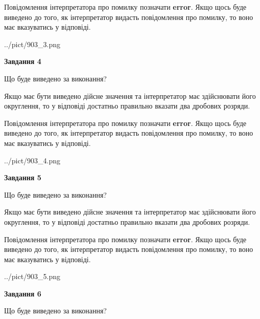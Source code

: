 \documentclass[12pt, ukrainian]{article}
\begin{document}
{\begin {Large}
Повідомлення інтерпретатора про помилку позначати \textbf{error}.
Якщо щось буде виведено до того, як інтерпретатор видасть повідомлення про помилку, 
то воно має вказуватись у відповіді. \par

\begin{center}
	{../pict/903_3.png}
\end{center}
\newpage

{\begin {center}\textbf{Завдання 4}\end {center}}\par
Що буде виведено за виконання? \par

Якщо має бути виведено дійсне значення та інтерпретатор має здійснювати його округлення, 
то у відповіді достатньо правильно вказати два дробових розряди.

Повідомлення інтерпретатора про помилку позначати \textbf{error}.
Якщо щось буде виведено до того, як інтерпретатор видасть повідомлення про помилку, 
то воно має вказуватись у відповіді. \par

\begin{center}
	{../pict/903_4.png}
\end{center}
\newpage

{\begin {center}\textbf{Завдання 5}\end {center}}\par
Що буде виведено за виконання? \par

Якщо має бути виведено дійсне значення та інтерпретатор має здійснювати його округлення, 
то у відповіді достатньо правильно вказати два дробових розряди.

Повідомлення інтерпретатора про помилку позначати \textbf{error}.
Якщо щось буде виведено до того, як інтерпретатор видасть повідомлення про помилку, 
то воно має вказуватись у відповіді. \par

\begin{center}
	{../pict/903_5.png}
\end{center}
\newpage

{\begin {center}\textbf{Завдання 6}\end {center}}\par
Що буде виведено за виконання? \par


\end{Large}}
\end{document}
